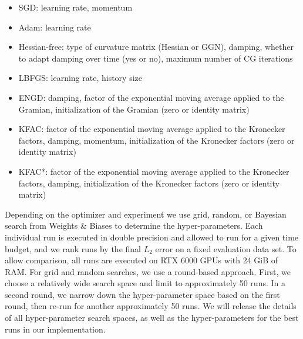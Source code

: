 \documentclass[10pt]{article}
\begin{document}
\begin{itemize}
  \item SGD: learning rate, momentum
  \item Adam: learning rate
  \item Hessian-free: type of curvature matrix (Hessian or GGN), damping, whether to adapt damping over time (yes or no), maximum number of CG iterations
  \item LBFGS: learning rate, history size
  \item ENGD: damping, factor of the exponential moving average applied to the Gramian, initialization of the Gramian (zero or identity matrix)
  \item KFAC: factor of the exponential moving average applied to the Kronecker factors, damping, momentum, initialization of the Kronecker factors (zero or identity matrix)
  \item KFAC*: factor of the exponential moving average applied to the Kronecker factors, damping, initialization of the Kronecker factors (zero or identity matrix)
\end{itemize}

Depending on the optimizer and experiment we use grid, random, or Bayesian search from Weights \& Biases to determine the hyper-parameters. Each individual run is executed in double precision and allowed to run for a given time budget, and we rank runs by the final $L_{2}$ error on a fixed evaluation data set. To allow comparison, all runs are executed on RTX 6000 GPUs with 24 GiB of RAM. For grid and random searches, we use a round-based approach. First, we choose a relatively wide search space and limit to approximately 50 runs. In a second round, we narrow down the hyper-parameter space based on the first round, then re-run for another approximately 50 runs. We will release the details of all hyper-parameter search spaces, as well as the hyper-parameters for the best runs in our implementation.
\end{document}
